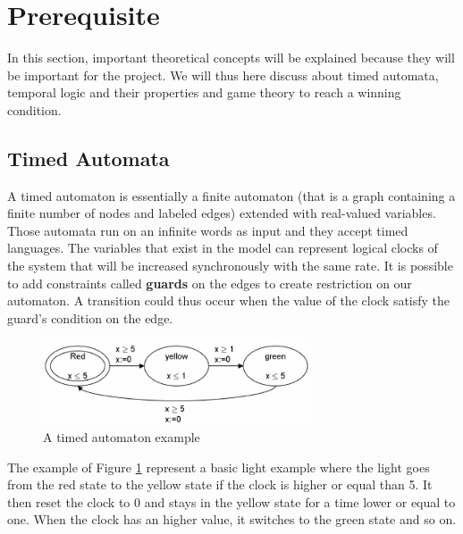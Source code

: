 \section{Prerequisite}
In this section, important theoretical concepts will be explained because they will be important for the project. We will thus here discuss about timed automata, temporal logic and their properties and game theory to reach a winning condition.

\subsection{Timed Automata} \label{sec:automate}
A timed automaton is essentially a finite automaton (that is a graph
containing a finite number of nodes and labeled edges) extended with real-valued variables. Those automata run on an infinite words as input and they accept timed languages. The variables that exist in the model can represent logical clocks of the system that will be increased synchronously with the same rate.
It is possible to add constraints called \textbf{guards} on the edges to create restriction on our automaton. A transition could thus occur when the value of the clock satisfy the guard's condition on the edge.

\begin{figure}[!ht]\label{fig:timed}
  \centering
    \includegraphics[width=0.7\textwidth]{picture/trafficlight.png}
    \caption{A timed automaton example}
\end{figure}

The example of Figure \ref{fig:timed} represent a basic light example where the light goes from the red state to the yellow state if the clock is higher or equal than 5. It then reset the clock to 0 and stays in the yellow state for a time lower or equal to one. When the clock has an higher value, it switches to the green state and so on.

